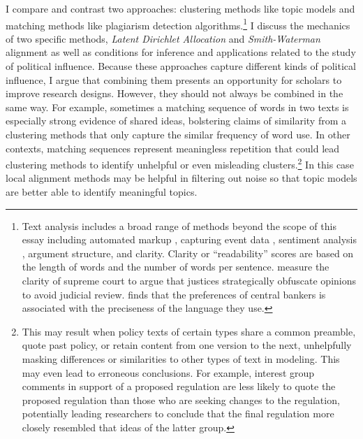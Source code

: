 \documentclass{article}
\begin{document}
I compare and contrast two approaches: clustering methods like topic models and matching methods like plagiarism detection algorithms.\footnote{Text analysis includes a broad range of methods beyond the scope of this essay including automated markup \citep{Cardie2008}, capturing event data \citep{Hanna2013Computer-aidedMovements}, sentiment analysis \citep{Ceron2014,Titov2008}, argument structure, and clarity. Clarity or ``readability'' scores are based on the length of words and the number of words per sentence. \citet{Owens2013} measure the clarity of supreme court to argue that justices strategically obfuscate opinions to avoid judicial review. \citet{Baerg2014} finds that the preferences of central bankers is associated with the preciseness of the language they use.} I discuss the mechanics of two specific methods, \textit{Latent Dirichlet Allocation} and \textit{Smith-Waterman} alignment as well as conditions for inference and applications related to the study of political influence. Because these approaches capture different kinds of political influence, I argue that combining them presents an opportunity for scholars to improve research designs. However, they should not always be combined in the same way. For example, sometimes a matching sequence of words in two texts is especially strong evidence of shared ideas, bolstering claims of similarity from a clustering methods that only capture the similar frequency of word use. In other contexts, matching sequences represent meaningless repetition that could lead clustering methods to identify unhelpful or even misleading clusters.\footnote{This may result when policy texts of certain types share a common preamble, quote past policy, or retain content from one version to the next, unhelpfully masking differences or similarities to other types of text in modeling.  This may even lead to erroneous conclusions. For example, interest group comments in support of a proposed regulation are less likely to quote the proposed regulation than those who are seeking changes to the regulation, potentially leading researchers to conclude that the final regulation more closely resembled that ideas of the latter group.} In this case local alignment methods may be helpful in filtering out noise so that topic models are better able to identify meaningful topics.
\end{document}
